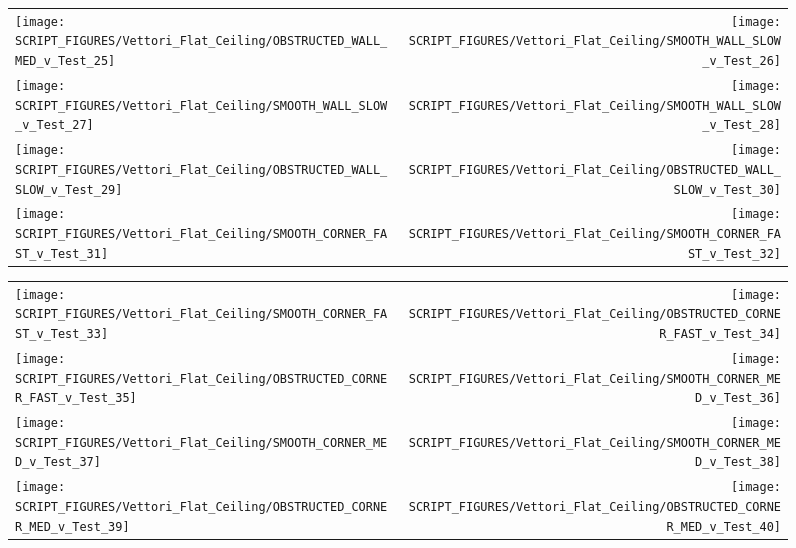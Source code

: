 \begin{figure}[p]
\begin{tabular*}{\textwidth}{l@{\extracolsep{\fill}}r}
\texttt{[image: SCRIPT\_FIGURES/Vettori\_Flat\_Ceiling/OBSTRUCTED\_WALL\_MED\_v\_Test\_25]} &
\texttt{[image: SCRIPT\_FIGURES/Vettori\_Flat\_Ceiling/SMOOTH\_WALL\_SLOW\_v\_Test\_26]} \\
\texttt{[image: SCRIPT\_FIGURES/Vettori\_Flat\_Ceiling/SMOOTH\_WALL\_SLOW\_v\_Test\_27]} &
\texttt{[image: SCRIPT\_FIGURES/Vettori\_Flat\_Ceiling/SMOOTH\_WALL\_SLOW\_v\_Test\_28]} \\
\texttt{[image: SCRIPT\_FIGURES/Vettori\_Flat\_Ceiling/OBSTRUCTED\_WALL\_SLOW\_v\_Test\_29]} &
\texttt{[image: SCRIPT\_FIGURES/Vettori\_Flat\_Ceiling/OBSTRUCTED\_WALL\_SLOW\_v\_Test\_30]} \\
\texttt{[image: SCRIPT\_FIGURES/Vettori\_Flat\_Ceiling/SMOOTH\_CORNER\_FAST\_v\_Test\_31]} &
\texttt{[image: SCRIPT\_FIGURES/Vettori\_Flat\_Ceiling/SMOOTH\_CORNER\_FAST\_v\_Test\_32]} \\
\end{tabular*}
\label{Vettori_4}
\end{figure}

\begin{figure}[p]
\begin{tabular*}{\textwidth}{l@{\extracolsep{\fill}}r}
\texttt{[image: SCRIPT\_FIGURES/Vettori\_Flat\_Ceiling/SMOOTH\_CORNER\_FAST\_v\_Test\_33]} &
\texttt{[image: SCRIPT\_FIGURES/Vettori\_Flat\_Ceiling/OBSTRUCTED\_CORNER\_FAST\_v\_Test\_34]} \\
\texttt{[image: SCRIPT\_FIGURES/Vettori\_Flat\_Ceiling/OBSTRUCTED\_CORNER\_FAST\_v\_Test\_35]} &
\texttt{[image: SCRIPT\_FIGURES/Vettori\_Flat\_Ceiling/SMOOTH\_CORNER\_MED\_v\_Test\_36]} \\
\texttt{[image: SCRIPT\_FIGURES/Vettori\_Flat\_Ceiling/SMOOTH\_CORNER\_MED\_v\_Test\_37]} &
\texttt{[image: SCRIPT\_FIGURES/Vettori\_Flat\_Ceiling/SMOOTH\_CORNER\_MED\_v\_Test\_38]} \\
\texttt{[image: SCRIPT\_FIGURES/Vettori\_Flat\_Ceiling/OBSTRUCTED\_CORNER\_MED\_v\_Test\_39]} &
\texttt{[image: SCRIPT\_FIGURES/Vettori\_Flat\_Ceiling/OBSTRUCTED\_CORNER\_MED\_v\_Test\_40]} \\
\end{tabular*}
\label{Vettori_5}
\end{figure}

